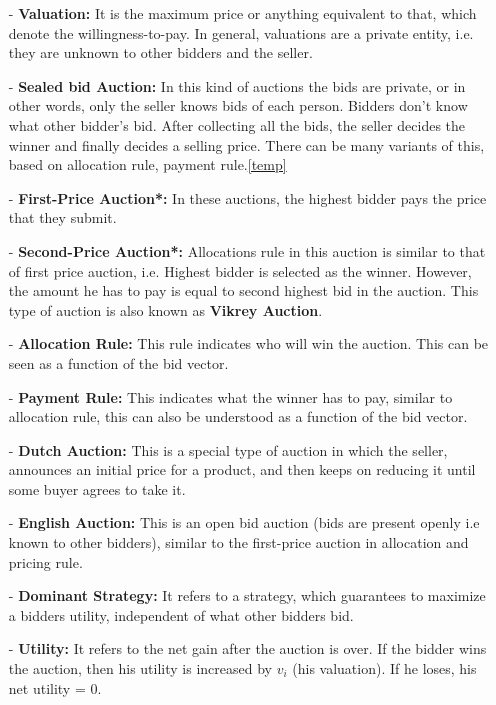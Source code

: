 \documentclass[a4paper]{article}
\begin{document}
\begin{itemize}
    \item[-] \textbf{Valuation:} It is the maximum price or anything equivalent to that, which denote the willingness-to-pay. 
    In general, valuations are a private entity, i.e. they are unknown to other bidders and the seller.  


    \item[-] \textbf{Sealed bid Auction:} In this kind of auctions the bids are private, or in other words, only the seller knows bids of each person.
    Bidders don't know what other bidder's bid.
    After collecting all the bids, the seller decides the winner and finally decides a selling price.
    There can be many variants of this, based on allocation rule, payment rule.\ref{temp}

    \item[-] \textbf{First-Price Auction*:} In these auctions, the highest bidder pays the price that they submit. \label{temp}

    \item[-] \textbf{Second-Price Auction*:} Allocations rule in this auction is similar to that of first price auction, i.e. Highest bidder is selected as the winner.
    However, the amount he has to pay is equal to second highest bid in the auction.
    This type of auction is also known as \textbf{Vikrey Auction}.

    \item[-] \textbf{Allocation Rule:} This rule indicates who will win the auction.
    This can be seen as a function of the bid vector.

    \item[-] \textbf{Payment Rule:} This indicates what the winner has to pay, similar to allocation rule, this can also be understood as a function of the bid vector.

    \item[-] \textbf{Dutch Auction:} This is a special type of auction in which the seller, announces an initial price for a product, and then keeps on reducing it until some buyer agrees to take it.

    \item[-] \textbf{English Auction:} This is an open bid auction (bids are present openly i.e known to other bidders), similar to the first-price auction in allocation and pricing rule.

    \item[-] \textbf{Dominant Strategy:} It refers to a strategy, which guarantees to maximize a bidders utility, independent of what other bidders bid.

    \item[-] \textbf{Utility:} It refers to the net gain after the auction is over. If the bidder wins the auction, then his utility is increased by $v_i$ (his valuation). If he loses, his net utility = $0$.
\end{itemize}
\end{document}
